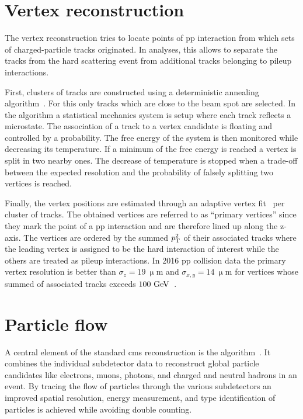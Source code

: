 


\section{Vertex reconstruction}


The vertex reconstruction tries to locate points of pp interaction from which sets of charged-particle tracks originated. In analyses, this allows to separate the tracks from the hard scattering event from additional tracks belonging to pileup interactions. 

First, clusters of tracks are constructed using a deterministic annealing algorithm~\cite{726788}. For this only tracks which are close to the beam spot are selected. In the algorithm a statistical mechanics system is setup where each track reflects a microstate. The association of a track to a vertex candidate is floating and controlled by a probability. The free energy of the system is then monitored while decreasing its temperature. If a minimum of the free energy is reached a vertex is split in two nearby ones. The decrease of temperature is stopped when a trade-off between the expected resolution and the probability of falsely splitting two vertices is reached.

Finally, the vertex positions are estimated through an adaptive vertex fit~\cite{0954-3899-34-12-N01} per cluster of tracks. The obtained vertices are referred to as ``primary vertices'' since they mark the point of a pp interaction and are therefore lined up along the z-axis. The vertices are ordered by the summed $p_\mathrm{T}^2$ of their associated tracks where the leading vertex is assigned to be the hard interaction of interest while the others are treated as pileup interactions. In 2016 pp collision data the primary vertex resolution is better than $\sigma_{z}=19~\upmu\mathrm{m}$ and $\sigma_{x,y}=14~\upmu\mathrm{m}$ for vertices whose summed \pt of associated tracks exceeds $100~\mathrm{GeV}$~\cite{CMS-DP-2016-041}.



\section{Particle flow}

A central element of the standard \gls{cms} reconstruction is the  algorithm~\cite{CMS:2009nxa}. It combines the individual subdetector data to reconstruct global particle candidates like electrons, muons, photons, and charged and neutral hadrons in an event. By tracing the flow of particles through the various subdetectors an improved spatial resolution, energy measurement, and type identification of particles is achieved while avoiding double counting.

